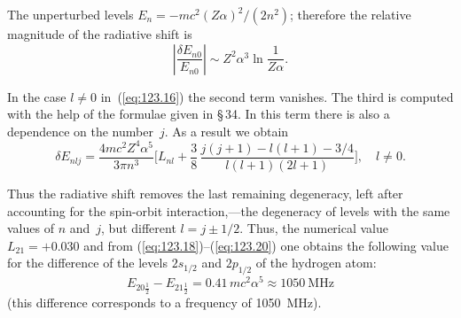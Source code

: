 The unperturbed levels $E_n = -mc^2(Z\alpha)^2/(2n^2)$; therefore the relative magnitude of the radiative shift is
\begin{equation}
\left|\frac{\delta E_{n0}}{E_{n0}}\right| \sim Z^2\alpha^3\ln\frac{1}{Z\alpha}.
\label{eq:123.19}
\end{equation}


In the case $l \neq 0$ in~(\ref{eq:123.16}) the second term vanishes. The third is computed with the help of the formulae given in \S\,34. In this term there is also a dependence on the number~$j$. As a result we obtain
\begin{equation}
\delta E_{nlj} = \frac{4mc^2 Z^4\alpha^5}{3\pi n^3}\biggl[L_{nl} + \frac{3}{8}\,\frac{j(j+1) - l(l+1) - 3/4}{l(l+1)(2l+1)}\biggr], \quad l \neq 0.
\label{eq:123.20}
\end{equation}

Thus the radiative shift removes the last remaining degeneracy, left after accounting for the spin-orbit interaction,---the degeneracy of levels with the same values of $n$ and~$j$, but different $l = j \pm 1/2$. Thus, the numerical value $L_{21} = +0.030$ and from (\ref{eq:123.18})--(\ref{eq:123.20}) one obtains the following value for the difference of the levels $2s_{1/2}$ and $2p_{1/2}$ of the hydrogen atom:
\[
E_{20\frac{1}{2}} - E_{21\frac{1}{2}} = 0.41\,mc^2\alpha^5 \approx 1050~\text{MHz}
\]
(this difference corresponds to a frequency of 1050~MHz).
